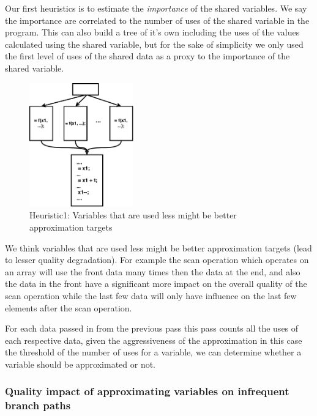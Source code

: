 \documentclass[12pt,conference]{IEEEtran}
\begin{document}
Our first heuristics is to estimate the \emph{importance} of 
the shared variables. We say the importance are correlated to 
the number of uses of the shared variable in the program. This
can also build a tree of it's own including the uses of the values
calculated using the shared variable, but for the sake of simplicity
we only used the first level of uses of the shared data as a proxy 
to the importance of the shared variable.
\begin{figure}[h]
    \centering
    \includegraphics[width=0.40\textwidth]{Heuristic1.pdf}
    \caption{Heuristic1: Variables that are used less might be better approximation targets}
    \label{fig:h1}
\end{figure}

We think variables that are used less might be better approximation 
targets (lead to lesser quality degradation). For example the scan
operation which operates on an array will use the front data many
times then the data at the end, and also the data in the front
have a significant more impact on the overall quality of the 
scan operation while the last few data will only have influence
on the last few elements after the scan operation.

For each data passed in from the previous pass this pass counts all 
the uses of each respective data, given the aggressiveness of 
the approximation in this case the threshold of the number of 
uses for a variable, we can determine whether a variable should 
be approximated or not.

\subsubsection{Quality impact of approximating variables on infrequent branch paths}
\end{document}
